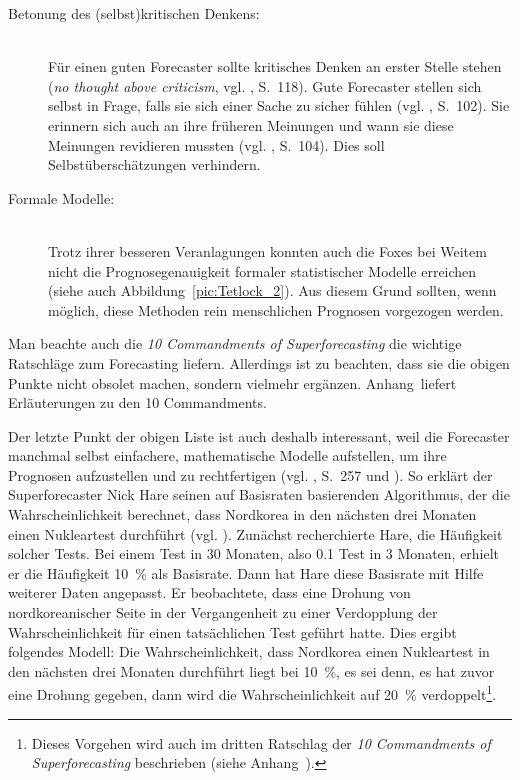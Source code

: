 \begin{description}
\item[Betonung des (selbst)kritischen Denkens:] \hfill \\
Für einen guten Forecaster sollte kritisches Denken an erster Stelle stehen
(\emph{no thought above criticism}, vgl. \cite{Tetlock}, S.~118). Gute Forecaster
stellen sich selbst in Frage, falls sie sich einer Sache zu sicher fühlen (vgl. \cite{Tetlock}, S.~102).
Sie erinnern sich auch an ihre früheren Meinungen und wann sie diese Meinungen revidieren mussten
(vgl. \cite{Tetlock}, S.~104). Dies soll Selbstüberschätzungen verhindern.

\item[Formale Modelle:] \hfill \\
Trotz ihrer besseren Veranlagungen konnten auch die Foxes bei Weitem nicht die Prognosegenauigkeit
formaler statistischer Modelle erreichen (siehe auch Abbildung~\ref{pic:Tetlock_2}). Aus diesem Grund sollten, wenn möglich, diese Methoden
rein menschlichen Prognosen vorgezogen werden.

\end{description}

Man beachte auch die \emph{10 Commandments of Superforecasting} die wichtige Ratschläge zum
Forecasting liefern. Allerdings ist zu beachten, dass sie die obigen Punkte nicht obsolet machen,
sondern vielmehr ergänzen. Anhang~\xcom liefert Erläuterungen zu den 10 Commandments.

Der letzte Punkt der obigen Liste ist auch deshalb interessant, weil die Forecaster manchmal selbst
einfachere, mathematische Modelle aufstellen, um ihre Prognosen aufzustellen und zu rechtfertigen
(vgl. \cite{Roetheli}, S.~257 und \cite{Burton}). So erklärt der Superforecaster Nick Hare seinen auf
Basisraten basierenden Algorithmus, der die Wahrscheinlichkeit berechnet, dass Nordkorea in den nächsten
drei Monaten einen Nukleartest durchführt (vgl. \cite{Burton}). Zunächst recherchierte Hare, die Häufigkeit
solcher Tests. Bei einem Test in 30 Monaten, also 0.1 Test in 3 Monaten, erhielt er die Häufigkeit 10~\%
als Basisrate. Dann hat Hare diese Basisrate mit Hilfe weiterer Daten angepasst. Er beobachtete, dass eine
Drohung von nordkoreanischer Seite in der Vergangenheit zu einer Verdopplung der Wahrscheinlichkeit für einen
tatsächlichen Test geführt hatte. Dies ergibt folgendes Modell: Die Wahrscheinlichkeit, dass Nordkorea einen
Nukleartest in den nächsten drei Monaten durchführt liegt bei 10~\%, es sei denn, es hat zuvor eine Drohung
gegeben, dann wird die Wahrscheinlichkeit auf 20~\% verdoppelt\footnote{
Dieses Vorgehen wird auch im dritten Ratschlag der \emph{10 Commandments of Superforecasting} beschrieben
(siehe Anhang~\xcom).
}.

